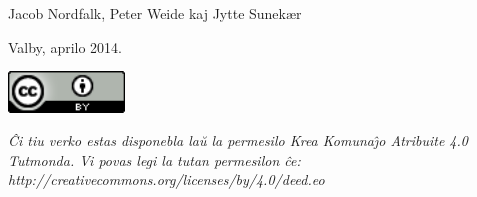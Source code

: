 \bigskip

{
Jacob Nordfalk, Peter Weide kaj Jytte Sunek{\ae}r}

{
Valby, aprilo 2014.}


\bigskip


\bigskip


\bigskip


\bigskip

{\centering{}

\includegraphics[width=3.104cm,height=1.094cm]{permisilo.png}
 \newline

\par}

{\centering{}\itshape
\^Ci tiu verko estas disponebla la\u{u} la permesilo \newline
Krea Komuna\^{\j}o Atribuite 4.0 Tutmonda.\newline
Vi povas legi la tutan permesilon \^ce:\newline
 http://creativecommons.org/licenses/by/4.0/deed.eo
\par}
